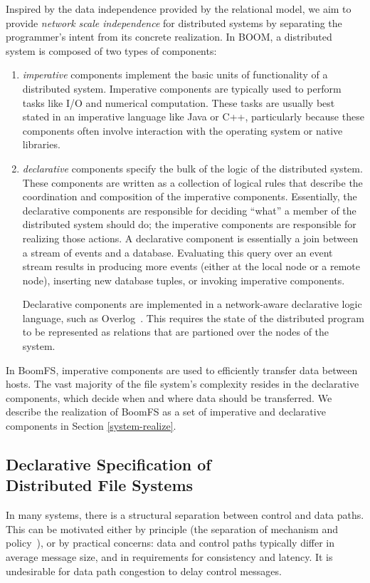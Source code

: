 \documentclass[twocolumn]{article}
\begin{document}
Inspired by the data independence provided by the relational model, we
aim to provide \emph{network scale independence} for distributed
systems by separating the programmer's intent from its concrete
realization. In BOOM, a distributed system is composed of two types of
components:
\begin{enumerate}
\item
  \emph{imperative} components implement the basic units of
  functionality of a distributed system. Imperative components are
  typically used to perform tasks like I/O and numerical
  computation. These tasks are usually best stated in an imperative
  language like Java or C++, particularly because these components
  often involve interaction with the operating system or native
  libraries.

\item
  \emph{declarative} components specify the bulk of the logic of the
  distributed system. These components are written as a collection of
  logical rules that describe the coordination and composition of the
  imperative components. Essentially, the declarative components are
  responsible for deciding ``what'' a member of the distributed system
  should do; the imperative components are responsible for realizing
  those actions. A declarative component is essentially a join between
  a stream of events and a database. Evaluating this query over an
  event stream results in producing more events (either at the local
  node or a remote node), inserting new database tuples, or invoking
  imperative components.

  Declarative components are implemented in a network-aware
  declarative logic language, such as Overlog~\cite{dn-sigmod}. This
  requires the state of the distributed program to be represented as
  relations that are partioned over the nodes of the system.
\end{enumerate}

In BoomFS, imperative components are used to efficiently transfer data
between hosts. The vast majority of the file system's complexity
resides in the declarative components, which decide when and where
data should be transferred. We describe the realization of BoomFS as a
set of imperative and declarative components in Section
\ref{system-realize}.

\subsection{Declarative Specification of\\Distributed File Systems}
In many systems, there is a structural separation between control and
data paths. This can be motivated either by principle (the separation
of mechanism and policy~\cite{hydra-policy-mech-sep}), or by practical
concerns: data and control paths typically differ in average message
size, and in requirements for consistency and latency. It is
undesirable for data path congestion to delay control messages.
\end{document}
